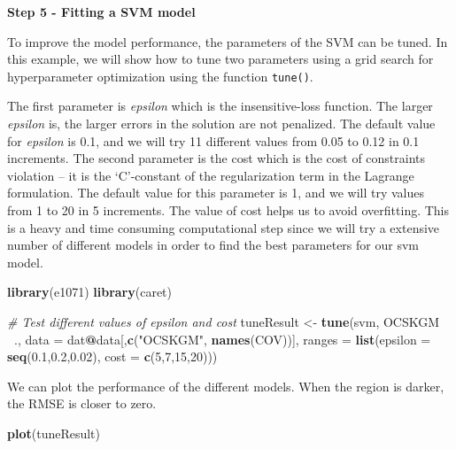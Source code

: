 \documentclass[10pt,b5paper,]{book}
\newenvironment{Shaded}{\begin{snugshade}}{\end{snugshade}}
\newcommand{\CommentTok}[1]{\textcolor[rgb]{0.56,0.35,0.01}{\textit{#1}}}
\newcommand{\DataTypeTok}[1]{\textcolor[rgb]{0.13,0.29,0.53}{#1}}
\newcommand{\DecValTok}[1]{\textcolor[rgb]{0.00,0.00,0.81}{#1}}
\newcommand{\FloatTok}[1]{\textcolor[rgb]{0.00,0.00,0.81}{#1}}
\newcommand{\KeywordTok}[1]{\textcolor[rgb]{0.13,0.29,0.53}{\textbf{#1}}}
\newcommand{\NormalTok}[1]{#1}
\newcommand{\OperatorTok}[1]{\textcolor[rgb]{0.81,0.36,0.00}{\textbf{#1}}}
\newcommand{\StringTok}[1]{\textcolor[rgb]{0.31,0.60,0.02}{#1}}
\theoremstyle{definition}
\theoremstyle{definition}
\theoremstyle{definition}
\theoremstyle{remark}
\begin{document}
\textbf{Step 5 - Fitting a SVM model}

To improve the model performance, the parameters of the SVM can be
tuned. In this example, we will show how to tune two parameters using a
grid search for hyperparameter optimization using the function
\texttt{tune()}.

The first parameter is \emph{epsilon} which is the insensitive-loss
function. The larger \emph{epsilon} is, the larger errors in the
solution are not penalized. The default value for \emph{epsilon} is 0.1,
and we will try 11 different values from 0.05 to 0.12 in 0.1 increments.
The second parameter is the cost which is the cost of constraints
violation -- it is the `C'-constant of the regularization term in the
Lagrange formulation. The default value for this parameter is 1, and we
will try values from 1 to 20 in 5 increments. The value of cost helps us
to avoid overfitting. This is a heavy and time consuming computational
step since we will try a extensive number of different models in order
to find the best parameters for our svm model.

\begin{Shaded}
\begin{Highlighting}[]
\KeywordTok{library}\NormalTok{(e1071)}
\KeywordTok{library}\NormalTok{(caret)}

\CommentTok{# Test different values of epsilon and cost}
\NormalTok{  tuneResult <-}\StringTok{ }\KeywordTok{tune}\NormalTok{(svm, OCSKGM }\OperatorTok{~}\NormalTok{.,  }\DataTypeTok{data =}\NormalTok{ dat}\OperatorTok{@}\NormalTok{data[,}\KeywordTok{c}\NormalTok{(}\StringTok{"OCSKGM"}\NormalTok{,}
                                                         \KeywordTok{names}\NormalTok{(COV))],}
                     \DataTypeTok{ranges =} \KeywordTok{list}\NormalTok{(}\DataTypeTok{epsilon =} \KeywordTok{seq}\NormalTok{(}\FloatTok{0.1}\NormalTok{,}\FloatTok{0.2}\NormalTok{,}\FloatTok{0.02}\NormalTok{),}
                                   \DataTypeTok{cost =} \KeywordTok{c}\NormalTok{(}\DecValTok{5}\NormalTok{,}\DecValTok{7}\NormalTok{,}\DecValTok{15}\NormalTok{,}\DecValTok{20}\NormalTok{)))}
\end{Highlighting}
\end{Shaded}

We can plot the performance of the different models. When the region is
darker, the RMSE is closer to zero.

\begin{Shaded}
\begin{Highlighting}[]
\KeywordTok{plot}\NormalTok{(tuneResult)}
\end{Highlighting}
\end{Shaded}
\end{document}
